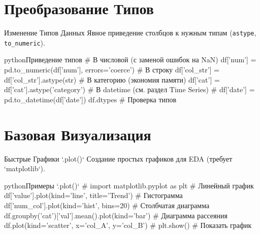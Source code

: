     \section{Преобразование Типов}
    
    \begin{myblock}{Изменение Типов Данных}
    Явное приведение столбцов к нужным типам (\texttt{astype}, \texttt{to\_numeric}).
    \begin{codebox}{python}{Приведение типов}
    # В числовой (с заменой ошибок на NaN)
    df['num'] = pd.to_numeric(df['num'], errors='coerce')
    # В строку
    df['col_str'] = df['col_str'].astype(str)
    # В категорию (экономия памяти)
    df['cat'] = df['cat'].astype('category')
    # В datetime (см. раздел Time Series)
    # df['date'] = pd.to_datetime(df['date'])
    df.dtypes # Проверка типов
    \end{codebox}
    \end{myblock}
    
    \section{Базовая Визуализация}
    
    \begin{myexampleblock}{Быстрые Графики `.plot()`}
    Создание простых графиков для EDA (требует `matplotlib`).
    \begin{codebox}{python}{Примеры `.plot()`}
    # import matplotlib.pyplot as plt
    # Линейный график
    df['value'].plot(kind='line', title='Trend')
    # Гистограмма
    df['num_col'].plot(kind='hist', bins=20)
    # Столбчатая диаграмма
    df.groupby('cat')['val'].mean().plot(kind='bar')
    # Диаграмма рассеяния
    df.plot(kind='scatter', x='col_A', y='col_B')
    # plt.show() # Показать график
    \end{codebox}
    \end{myexampleblock}
    
